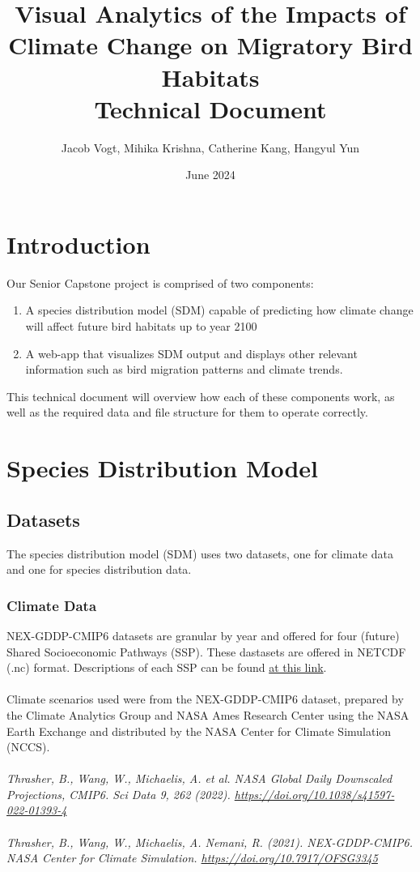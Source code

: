 \documentclass{article}
\title{Visual Analytics of the Impacts of Climate Change on 
Migratory Bird Habitats \\
 \Large{Technical Document}}
\author{Jacob Vogt, Mihika Krishna, Catherine Kang, Hangyul Yun}
\affil{Professor Dongyu Liu}
\affil{University of California, Davis}
\date{June 2024}
\begin{document}
\maketitle

\tableofcontents

\newpage

\section*{Introduction}
Our Senior Capstone project is comprised of two components:

\begin{enumerate}
  \item A species distribution model (SDM) capable of predicting how climate change will affect future bird habitats up to year 2100
  \item A web-app that visualizes SDM output and displays other relevant information such as bird migration patterns and climate trends.
\end{enumerate}

This technical document will overview how each of these components work, as well as the required data and file structure for them to operate correctly.

\section{Species Distribution Model}

\subsection{Datasets}

The species distribution model (SDM) uses two datasets, one for climate data and one for species distribution data. 

\subsubsection*{Climate Data}

NEX-GDDP-CMIP6 datasets are granular by year and offered for four (future) Shared Socioeconomic Pathways (SSP). These dastasets are offered in NETCDF (.nc) format. 
Descriptions of each SSP can be found \href{https://www.carbonbrief.org/explainer-how-shared-socioeconomic-pathways-explore-future-climate-change/}{at this link}.
\\\\
Climate scenarios used were from the NEX-GDDP-CMIP6 dataset, prepared by the
Climate Analytics Group and NASA Ames Research Center using the NASA Earth
Exchange and distributed by the NASA Center for Climate Simulation (NCCS).
\\\\
\textit{
Thrasher, B., Wang, W., Michaelis, A. et al. NASA Global Daily Downscaled
Projections, CMIP6. Sci Data 9, 262 (2022). \url{https://doi.org/10.1038/s41597-022-01393-4}
\\\\
Thrasher, B., Wang, W., Michaelis, A. Nemani, R. (2021). NEX-GDDP-CMIP6. NASA
Center for Climate Simulation. \url{https://doi.org/10.7917/OFSG3345}}
\end{document}
